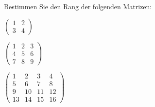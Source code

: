 Bestimmen Sie den Rang der folgenden Matrizen:
\begin{teilaufgaben}
\item $\begin{pmatrix}1&2\\3&4\end{pmatrix}$
\item $\begin{pmatrix}1&2&3\\4&5&6\\7&8&9\end{pmatrix}$
\item $\begin{pmatrix}1&2&3&4\\5&6&7&8\\9&10&11&12\\13&14&15&16\end{pmatrix}$
\end{teilaufgaben}

